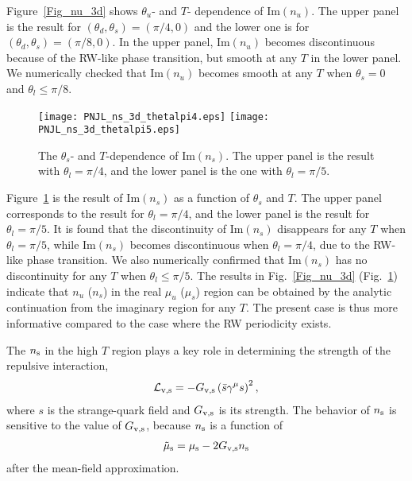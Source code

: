 \documentclass[prd,superscriptaddress,unsortedaddress,
twocolumn,showpacs,preprintnumbers,amsmath,amssymb]{revtex4}
\begin{document}
  Figure~\ref{Fig_nu_3d}
  shows $\theta_{u}$- and $T$- dependence of $\textrm{Im}(n_{u})$.
  The upper panel is the result for
  $(\theta_{d},\theta_{s})=(\pi/4,0)$
  and the lower one is for
  $(\theta_{d},\theta_{s})=(\pi/8,0)$.
  In the upper panel, $\textrm{Im}(n_{u})$
  becomes discontinuous
  because of the RW-like phase transition,
  but smooth at any $T$ in the lower panel.
  We numerically checked that
  $\textrm{Im}(n_{u})$ becomes smooth
  at any $T$ when $\theta_{s}=0$ and $\theta_{l}\le \pi/8$.

  \begin{figure}
   \begin{center}
    \texttt{[image: PNJL\_ns\_3d\_thetalpi4.eps]}
    \texttt{[image: PNJL\_ns\_3d\_thetalpi5.eps]}
   \end{center}
       \caption{
   The $\theta_{s}$- and $T$-dependence of $\textrm{Im}(n_{s})$.
   The upper panel is the result with
   $\theta_{l}=\pi/4$, and the lower panel is the one with $\theta_{l}=\pi/5$.
      }
      \label{Fig_ns_3d}
  \end{figure}

  Figure~\ref{Fig_ns_3d}
  is the result of $\textrm{Im}\left(n_{s}\right)$
  as a function of $\theta_{s}$ and $T$.
  The upper panel corresponds to the result
  for $\theta_{l}=\pi/4$,
  and the lower panel is the result for $\theta_{l}=\pi/5$.
  It is found that the discontinuity of $\textrm{Im}(n_{s})$
  disappears for any $T$ when $\theta_{l}=\pi/5$,
  while $\textrm{Im}(n_{s})$ becomes discontinuous
  when $\theta_{l}=\pi/4$,
  due to the RW-like phase transition.
  We also numerically confirmed that
  $\textrm{Im}(n_{s})$ has no discontinuity
  for any $T$ when $\theta_{l}\le \pi/5$.
  The results in Fig.~\ref{Fig_nu_3d} (Fig.~\ref{Fig_ns_3d})
  indicate that $n_{u}$ ($n_{s}$)
  in the real $\mu_{u}$ ($\mu_{s}$) region
  can be obtained by the analytic continuation
  from the imaginary region for any $T$.
  The present case is thus more informative
  compared to the case where the RW periodicity exists.

  The $n_{\rm s}$ in the high $T$ region
  plays a key role in determining the strength of
  the repulsive interaction, 
  \begin{eqnarray}
   \mathcal{L}_{\rm v,s}=-G_{\rm v, s}\left(\bar{s}\gamma^{\mu}s\right)^2, 
    \label{repulsive_strange}
  \end{eqnarray}
where $s$ is the strange-quark field and $G_{\rm v,s}$ is its 
strength.
  The behavior of $n_{\rm s}$ is sensitive to the value of
  $G_{\rm v,s}$, 
  because $n_{\rm s}$ is a function of
  \begin{eqnarray}
   \tilde{\mu}_{\rm s}=\mu_{\rm s}-2G_{\rm v,s}n_{\rm s}
  \end{eqnarray}
  after the mean-field approximation.
\end{document}
